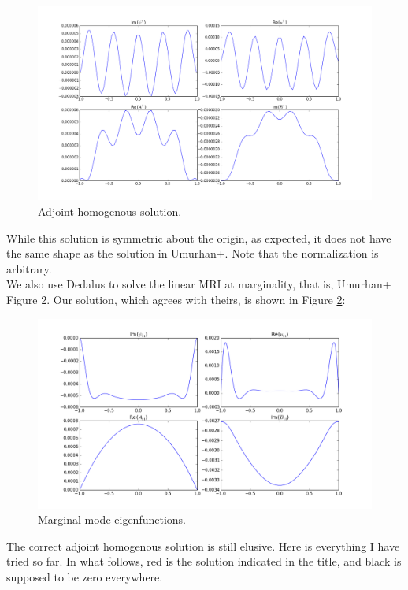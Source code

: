 \documentclass[letterpaper,12pt]{article}
\begin{document}
\begin{figure}[h!]
\centering
\includegraphics[width=\textwidth]{adjoint_soln_incorrect}
\caption{Adjoint homogenous solution.}
\label{AHsol}
\end{figure}

While this solution is symmetric about the origin, as expected, it does not have the same shape as the solution in Umurhan+. Note that the normalization is arbitrary. \\

We also use Dedalus to solve the linear MRI at marginality, that is, Umurhan+ Figure 2. Our solution, which agrees with theirs, is shown in Figure \ref{margsol}:

\begin{figure}[h!]
\centering
\includegraphics[width=\textwidth]{marginal_solution}
\caption{Marginal mode eigenfunctions.}
\label{margsol}
\end{figure}

\pagebreak
The correct adjoint homogenous solution is still elusive. Here is everything I have tried so far. In what follows, red is the solution indicated in the title, and black is supposed to be zero everywhere. \\
\end{document}
